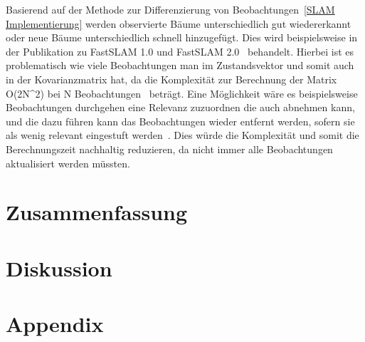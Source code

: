 \documentclass[11pt]{article}
\begin{document}
Basierend auf der Methode zur Differenzierung von Beobachtungen~\ref{SLAM Implementierung} werden observierte Bäume unterschiedlich gut wiedererkannt oder neue Bäume unterschiedlich schnell hinzugefügt. Dies wird beispielsweise in der Publikation zu FastSLAM 1.0 und FastSLAM 2.0~\cite{thrun_fastslam_nodate} behandelt. Hierbei ist es problematisch wie viele Beobachtungen man im Zustandsvektor und somit auch in der Kovarianzmatrix hat, da die Komplexität zur Berechnung der Matrix O(2N^2) bei N Beobachtungen~\cite{ute_SLAM} beträgt. Eine Möglichkeit wäre es beispielsweise Beobachtungen durchgehen eine Relevanz zuzuordnen die auch abnehmen kann, und die dazu führen kann das Beobachtungen wieder entfernt werden, sofern sie als wenig relevant eingestuft werden~\cite{thrun_fastslam_nodate}. Dies würde die Komplexität und somit die Berechnungszeit nachhaltig reduzieren, da nicht immer alle Beobachtungen aktualisiert werden müssten.

\section{Zusammenfassung}\label{Zusammenfassung}

\section{Diskussion}\label{Diskussion}

\section{Appendix}\label{Appendix}




\end{document}
